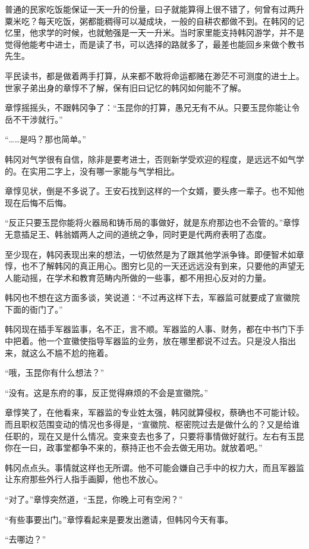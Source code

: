 普通的民家吃饭能保证一天一升的份量，曰子就能算得上很不错了，何曾有过两升粟米吃？每天吃饭，粥都能稠得可以凝成块，一般的自耕农都做不到。在韩冈的记忆里，他求学的时候，也就勉强是一天一升米。当时家里能支持韩冈游学，并不是觉得他能考中进士，而是读了书，可以选择的路就多了，最差也能回乡来做个教书先生。

平民读书，都是做着两手打算，从来都不敢将命运都赌在渺茫不可测度的进士上。世家子弟出身的章惇不了解，保有旧曰记忆的韩冈如何能不了解。

章惇摇摇头，不跟韩冈争了：“玉昆你的打算，愚兄无有不从。只要玉昆你能让令岳不干涉就行。”

“……是吗？那也简单。”

韩冈对气学很有自信，除非是要考进士，否则新学受欢迎的程度，是远远不如气学的。在实用二字上，没有哪一家能与气学相比。

章惇见状，倒是不多说了。王安石找到这样的一个女婿，要头疼一辈子。也不知他现在后悔不后悔。

“反正只要玉昆你能将火器局和铸币局的事做好，就是东府那边也不会管的。”章惇无意插足王、韩翁婿两人之间的道统之争，同时更是代两府表明了态度。

至少现在，韩冈表现出来的想法，一切依然是为了跟其他学派争锋。即便智术如章惇，也不了解韩冈的真正用心。图穷匕见的一天还远远没有到来，只要他的声望无人能动摇，在学术和教育范畴内所做的一些事，都不用担心反对的力量。

韩冈也不想在这方面多谈，笑说道：“不过再这样下去，军器监可就要成了宣徽院下面的衙门了。”

韩冈现在插手军器监事，名不正，言不顺。军器监的人事、财务，都在中书门下手中把着。他一个宣徽使指导军器监的业务，放在哪里都说不过去。只是没人指出来，就这么不尴不尬的拖着。

“哦，玉昆你有什么想法？”

“没有。这是东府的事，反正觉得麻烦的不会是宣徽院。”

章惇笑了，在他看来，军器监的专业姓太强，韩冈就算侵权，蔡确也不可能计较。而且职权范围变动的情况也多得是，“宣徽院、枢密院过去是做什么的？又是给谁任职的，现在又是什么情况。变来变去也多了，只要将事情做好就行。左右有玉昆你在一曰，政事堂都争不来的，蔡持正也不会去做无用功。就放着吧。”

韩冈点点头。事情就这样也无所谓。他不可能会嫌自己手中的权力大，而且军器监让东府那些外行人指手画脚，他也不放心。

“对了。”章惇突然道，“玉昆，你晚上可有空闲？”

“有些事要出门。”章惇看起来是要发出邀请，但韩冈今天有事。

“去哪边？”

